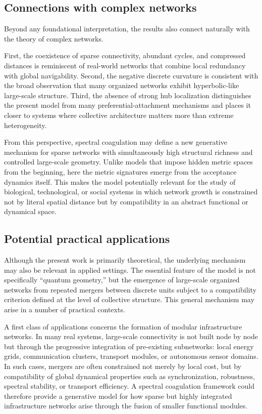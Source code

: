 \documentclass[11pt]{article}
\begin{document}
\subsection{Connections with complex networks}

Beyond any foundational interpretation, the results also connect naturally with the theory of complex networks.

First, the coexistence of sparse connectivity, abundant cycles, and compressed distances is reminiscent of real-world networks that combine local redundancy with global navigability.
Second, the negative discrete curvature is consistent with the broad observation that many organized networks exhibit hyperbolic-like large-scale structure.
Third, the absence of strong hub localization distinguishes the present model from many preferential-attachment mechanisms and places it closer to systems where collective architecture matters more than extreme heterogeneity.

From this perspective, spectral coagulation may define a new generative mechanism for sparse networks with simultaneously high structural richness and controlled large-scale geometry.
Unlike models that impose hidden metric spaces from the beginning, here the metric signatures emerge from the acceptance dynamics itself.
This makes the model potentially relevant for the study of biological, technological, or social systems in which network growth is constrained not by literal spatial distance but by compatibility in an abstract functional or dynamical space.

\subsection{Potential practical applications}
\label{sec:applications}

Although the present work is primarily theoretical, the underlying mechanism may also be relevant in applied settings.
The essential feature of the model is not specifically ``quantum geometry,'' but the emergence of large-scale organized networks from repeated mergers between discrete units subject to a compatibility criterion defined at the level of collective structure.
This general mechanism may arise in a number of practical contexts.

A first class of applications concerns the formation of modular infrastructure networks.
In many real systems, large-scale connectivity is not built node by node but through the progressive integration of pre-existing subnetworks:
local energy grids, communication clusters, transport modules, or autonomous sensor domains.
In such cases, mergers are often constrained not merely by local cost, but by compatibility of global dynamical properties such as synchronization, robustness, spectral stability, or transport efficiency.
A spectral coagulation framework could therefore provide a generative model for how sparse but highly integrated infrastructure networks arise through the fusion of smaller functional modules.
\end{document}
